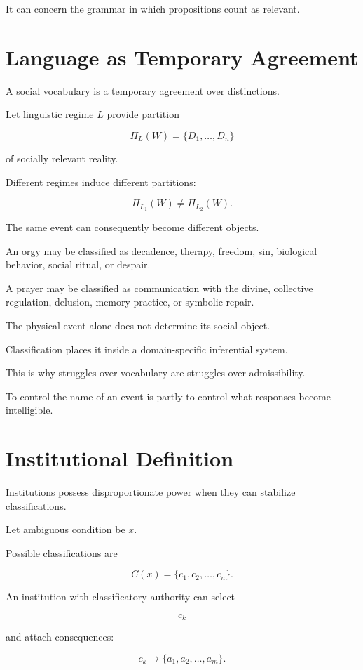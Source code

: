 \documentclass[11pt,oneside]{book}
\theoremstyle{definition}
\theoremstyle{remark}
\begin{document}
It can concern the grammar in which propositions count as relevant.

\section{Language as Temporary Agreement}

A social vocabulary is a temporary agreement over distinctions.

Let linguistic regime \(L\) provide partition

\[
\Pi_L(W)
=
\{D_1,\ldots,D_n\}
\]

of socially relevant reality.

Different regimes induce different partitions:

\[
\Pi_{L_1}(W)
\neq
\Pi_{L_2}(W).
\]

The same event can consequently become different objects.

An orgy may be classified as decadence, therapy, freedom, sin, biological behavior, social ritual, or despair.

A prayer may be classified as communication with the divine, collective regulation, delusion, memory practice, or symbolic repair.

The physical event alone does not determine its social object.

Classification places it inside a domain-specific inferential system.

This is why struggles over vocabulary are struggles over admissibility.

To control the name of an event is partly to control what responses become intelligible.

\section{Institutional Definition}

Institutions possess disproportionate power when they can stabilize classifications.

Let ambiguous condition be \(x\).

Possible classifications are

\[
C(x)
=
\{c_1,c_2,\ldots,c_n\}.
\]

An institution with classificatory authority can select

\[
c_k
\]

and attach consequences:

\[
c_k
\rightarrow
\{a_1,a_2,\ldots,a_m\}.
\]
\end{document}
